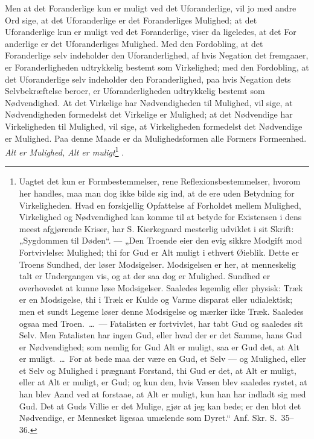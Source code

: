 \documentclass[12pt]{book}
\newcommand{\opage}[1]{\marginnote{\footnotesize\textit{[#1]}}}
\begin{document}
Men at det Foranderlige kun er muligt ved det Uforanderlige,
vil jo med andre Ord sige, at det Uforanderlige er
det Foranderliges Mulighed; at det Uforanderlige kun er
muligt ved det Foranderlige, viser da ligeledes, at det For%
\opage{249}anderlige er det Uforanderliges Mulighed. Med den Fordobling,
at det Foranderlige selv indeholder den Uforanderlighed,
af hvis Negation det fremgaaer, er Foranderligheden
udtrykkelig bestemt som Virkelighed; med den Fordobling, at
det Uforanderlige selv indeholder den Foranderlighed, paa hvis
Negation dets Selvbekræftelse beroer, er Uforanderligheden udtrykkelig
bestemt som Nødvendighed. At det Virkelige har
Nødvendigheden til Mulighed, vil sige, at Nødvendigheden
formedelst det Virkelige er Mulighed; at det Nødvendige har
Virkeligheden til Mulighed, vil sige, at Virkeligheden formedelst
det Nødvendige er Mulighed. Paa denne Maade er da Mulighedsformen
alle Formers Formeenhed. \emph{Alt er Mulighed,
Alt er muligt}\footnote{Uagtet det kun er Formbestemmelser, rene Reflexionsbestemmelser,
hvorom her handles, maa man dog ikke bilde sig ind, at de ere
uden Betydning for Virkeligheden. Hvad en forskjellig Opfattelse
af Forholdet mellem Mulighed, Virkelighed og Nødvendighed kan
komme til at betyde for Existensen i dens meest afgjørende Kriser,
har S. Kierkegaard mesterlig udviklet i sit Skrift: „Sygdommen
til Døden“. --- „Den Troende eier den evig sikkre Modgift mod
Fortvivlelse: Mulighed; thi for Gud er Alt muligt i ethvert Øieblik.
Dette er Troens Sundhed, der løser Modsigelser. Modsigelsen
er her, at menneskelig talt er Undergangen vis, og at der
saa dog er Mulighed. Sundhed er overhovedet at kunne løse
Modsigelser. Saaledes legemlig eller physisk: Træk er en Modsigelse,
thi i Træk er Kulde og Varme disparat eller udialektisk; men et
sundt Legeme løser denne Modsigelse og mærker ikke Træk. Saaledes
ogsaa med Troen.~\dots\ --- Fatalisten er fortvivlet, har tabt
Gud og saaledes sit Selv. Men Fatalisten har ingen Gud, eller
hvad der er det Samme, hans Gud er Nødvendighed; som nemlig
for Gud Alt er muligt, saa er Gud det, at Alt er muligt.~\dots\
For at bede maa der være en Gud, et Selv --- og Mulighed, eller
et Selv og Mulighed i prægnant Forstand, thi Gud er det, at Alt
er muligt, eller at Alt er muligt, er Gud; og kun den, hvis Væsen
blev saaledes rystet, at han blev Aand ved at forstaae, at Alt er muligt,
kun han har indladt sig med Gud. Det at Guds Villie er det
Mulige, gjør at jeg kan bede; er den blot det Nødvendige, er
Mennesket ligesaa umælende som Dyret.“ Anf. Skr. S.~35--36.}%
.
\end{document}
